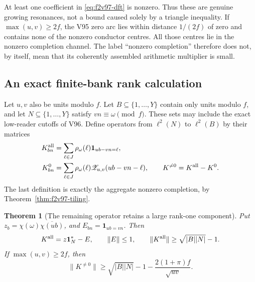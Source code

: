 \documentclass[11pt]{article}
\newtheorem{theorem}{Theorem}[section]
\theoremstyle{definition}
\theoremstyle{remark}
\begin{document}
At least one coefficient in \eqref{eq:f2v97-dft} is nonzero.  Thus these
are genuine growing resonances, not a bound caused solely by a triangle
inequality.  If \(\max(u,v)\ge2f\), the V95 zero arc lies within
distance \(1/(2f)\) of zero and contains none of the nonzero conductor
centres.  All those centres lie in the nonzero completion channel.
The label ``nonzero completion'' therefore does not, by itself, mean
that its coherently assembled arithmetic multiplier is small.

\subsection{An exact finite-bank rank calculation}

Let \(u,v\) also be units modulo \(f\).  Let \(B\subseteq\{1,\ldots,Y\}\)
contain only units modulo \(f\), and let
\(N\subseteq\{1,\ldots,Y\}\) satisfy \(vn\equiv\omega\pmod f\).
These sets may include the exact low-reader cutoffs of V96.  Define
operators from \(\ell^2(N)\) to \(\ell^2(B)\) by their matrices
\begin{align}
 K^{\rm all}_{bn}&=\sum_{\ell\in J}\rho_\omega(\ell)
                       \mathbf1_{ub-vn=\ell},
 \label{eq:f2v97-Kall}\\
 K^0_{bn}&=\sum_{\ell\in J}\rho_\omega(\ell)
                       \mathscr Z_{u,v}(ub-vn-\ell),\qquad
 K^{\ne0}=K^{\rm all}-K^0.
 \label{eq:f2v97-Kparts}
\end{align}
The last definition is exactly the aggregate nonzero completion, by
Theorem~\ref{thm:f2v97-tiling}.

\begin{theorem}[The remaining operator retains a large rank-one component]
\label{thm:f2v97-rank-one}
Put \(z_b=\chi(\omega)\overline{\chi(ub)}\), and
\(E_{bn}=\mathbf1_{ub=vn}\).  Then
\begin{equation}
 K^{\rm all}=z\mathbf1_N^*-E,\qquad \|E\|\le1,
 \qquad \|K^{\rm all}\|\ge\sqrt{|B||N|}-1.
 \label{eq:f2v97-rank-one}
\end{equation}
If \(\max(u,v)\ge2f\), then
\begin{equation}
 \|K^{\ne0}\|\ge\sqrt{|B||N|}-1
                    -\frac{2(1+\pi)f}{\sqrt{uv}}.
 \label{eq:f2v97-nonzero-lower}
\end{equation}
\end{theorem}
\end{document}
